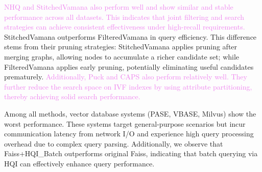 \documentclass[sigconf, nonacm]{acmart}
\begin{document}
{	\textcolor{violet}{NHQ and StitchedVamana also perform well and show similar and stable performance across all datasets. This indicates that joint filtering and search strategies can achieve consistent effectiveness under high-recall requirements.} StitchedVamana outperforms FilteredVamana in query efficiency. This difference stems from their pruning strategies: StitchedVamana applies pruning after merging graphs, allowing nodes to accumulate a richer candidate set; while FilteredVamana applies early pruning, potentially eliminating useful candidates prematurely.
	\textcolor{violet}{Additionally, Puck and CAPS also perform relatively well. They further reduce the search space on IVF indexes by using attribute partitioning, thereby achieving solid search performance.}
	
	Among all methods, vector database systems (PASE, VBASE, Milvus) show the worst performance. These systems target general-purpose scenarios but incur communication latency from network I/O and experience high query processing overhead due to complex query parsing. Additionally, we observe that Faiss+HQI\_Batch outperforms original Faiss, indicating that batch querying via HQI can effectively enhance query performance.
	
	
}
\end{document}
